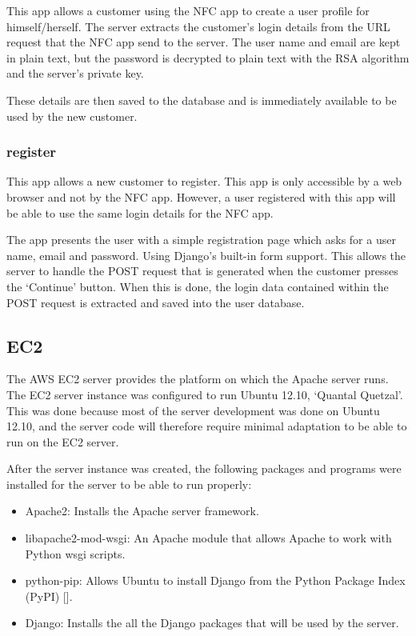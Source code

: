 This app allows a customer using the NFC app to create a user profile for himself/herself. The
server extracts the customer's login details from the URL request that the NFC app send to the
server. The user name and email are kept in plain text, but the password is decrypted to
plain text with the RSA algorithm and the server's private key.

These details are then saved to the database and is immediately available to be used by the new
customer. 

\subsubsection{register}

This app allows a new customer to register. This app is only accessible by a web browser and
not by the NFC app. However, a user registered with this app will be able to use the same login
details for the NFC app.

The app presents the user with a simple registration page which asks for a user name, email and
password. Using Django's built-in form support. This allows the server to handle the
POST request that is generated when the customer presses the `Continue' button. When this is
done, the login data contained within the POST request is extracted and saved into the user
database. 

\subsection{EC2}

The AWS EC2 server provides the platform on which the Apache server runs. The EC2 server
instance was configured to run Ubuntu 12.10, `Quantal Quetzal'. This was done because most of
the server development was done on Ubuntu 12.10, and the server code will therefore require
minimal adaptation to be able to run on the EC2 server. 

After the server instance was created, the following packages and programs were installed for
the server to be able to run properly:

\begin{itemize}
  \item Apache2: Installs the Apache server framework.
  \item libapache2-mod-wsgi: An Apache module that allows Apache to work with Python wsgi
  scripts.
  \item python-pip: Allows Ubuntu to install Django from the Python Package Index (PyPI)
  [\cite{website:pypi}].
  \item Django: Installs the all the Django packages that will be used by the server. 
\end{itemize}

